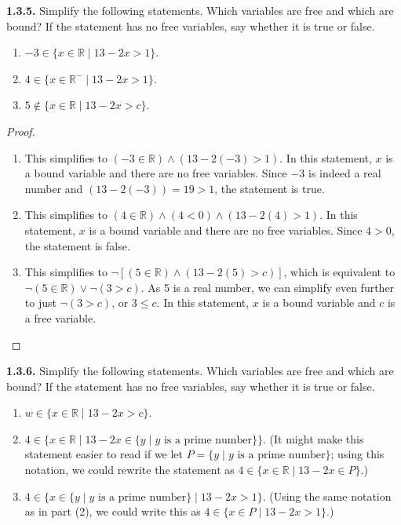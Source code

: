 \documentclass[12pt]{amsart}
\newenvironment{statement}[1]{\smallskip\noindent\color[rgb]{.6627, .3529, .6314} {\bf #1.}}{}
\theoremstyle{definition}
\theoremstyle{remark}
\newcommand{\BR}{\mathbb R}
\begin{document}
\begin{statement}{1.3.5}
Simplify the following statements.
Which variables are free and which are bound?
If the statement has no free variables, say whether it is true or false.
\begin{enumerate}
	\item $-3 \in \{ x \in \BR \mid 13 - 2x > 1 \}$.
	\item $4 \in \{ x \in \BR^{-} \mid 13 - 2x > 1 \}$.
	\item $5 \notin \{ x \in \BR \mid 13 - 2x > c \}$.
\end{enumerate}
\end{statement}

\begin{proof}
\hfill
\begin{enumerate}
	\item This simplifies to $(-3 \in \BR) \wedge (13 - 2(-3) > 1)$.
	In this statement, $x$ is a bound variable and there are no free variables.
	Since $-3$ is indeed a real number and $(13 - 2(-3)) = 19 > 1$, the statement is true.
	
	\item This simplifies to $(4 \in \BR) \wedge (4 < 0) \wedge (13 - 2(4) > 1)$.
	In this statement, $x$ is a bound variable and there are no free variables.
	Since $4 > 0$, the statement is false.
	
	\item This simplifies to $\neg [(5 \in \BR) \wedge (13 - 2(5) > c)]$, which is equivalent to $\neg(5 \in \BR) \vee \neg (3 > c)$.
	As 5 is a real number, we can simplify even further to just $\neg (3 > c)$, or $3 \leq c$.
	In this statement, $x$ is a bound variable and $c$ is a free variable.
\end{enumerate}
\end{proof}


\begin{statement}{1.3.6}
Simplify the following statements.
Which variables are free and which are bound?
If the statement has no free variables, say whether it is true or false.
\begin{enumerate}
	\item $w \in \{ x \in \BR \mid 13 - 2x > c \}$.
	
	\item $4 \in \{ x \in \BR \mid 13 - 2x \in \{ y \mid y \text{ is a prime number} \} \}$.
	(It might make this statement easier to read if we let $P = \{ y \mid y \text{ is a prime number} \}$;
	using this notation, we could rewrite the statement as $4 \in \{ x \in \BR \mid 13 - 2x \in P \}$.)
	
	\item $4 \in \{ x \in \{ y \mid y \text{ is a prime number} \} \mid 13 - 2x > 1 \}$.
	(Using the same notation as in part (2), we could write this as $4 \in \{ x \in P \mid 13 - 2x > 1 \}$.)
\end{enumerate}
\end{statement}
\end{document}
